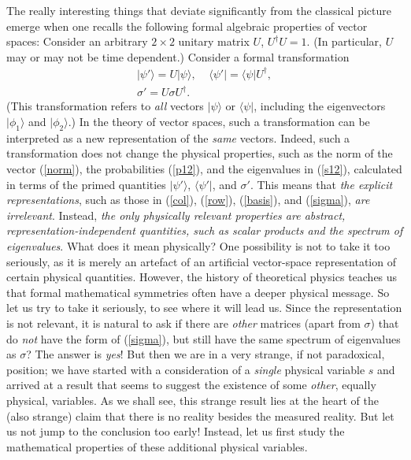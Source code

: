 \documentclass[12pt]{article}
\begin{document}
The really interesting things that deviate significantly from the  
classical picture emerge when one recalls the 
following formal algebraic properties of vector spaces:
Consider an arbitrary $2\times 2$ unitary matrix $U$, $U^{\dagger}U=1$.
(In particular, $U$ may or may not be time dependent.) 
Consider a formal transformation 
\begin{eqnarray}    
& |\psi'\rangle =U|\psi\rangle , \;\;\;\;
\langle\psi'|=\langle\psi|U^{\dagger} , & \nonumber \\ 
& \sigma'=U\sigma U^{\dagger} . &
\end{eqnarray}
(This transformation refers to {\em all} vectors $|\psi\rangle$
or $\langle\psi|$, 
including the eigenvectors $|\phi_1\rangle$ and $|\phi_2\rangle$.)  
In the theory of vector spaces, such a transformation can be interpreted 
as a new representation of the {\em same} vectors. 
Indeed, such a transformation does not change the physical properties, 
such as the norm of the vector (\ref{norm}), the probabilities
(\ref{p12}), and the eigenvalues in (\ref{s12}), calculated 
in terms of the primed quantities $|\psi'\rangle$, $\langle\psi'|$, 
and $\sigma'$. This means that {\em the explicit representations}, 
such as those in (\ref{col}), (\ref{row}), (\ref{basis}), and (\ref{sigma}),
{\em are irrelevant}. Instead, {\em the only physically relevant
properties are abstract, representation-independent quantities, 
such as scalar products and the spectrum of eigenvalues}.
What does it mean physically? One possibility is not to take it 
too seriously, as it is merely an artefact of an artificial 
vector-space representation of certain physical quantities.
However, the history of theoretical physics teaches us that formal 
mathematical symmetries often have a deeper physical message.
So let us try to take it seriously, to see where it 
will lead us. Since the representation is not relevant, 
it is natural to ask if there are {\em other} matrices
(apart from $\sigma$) that do {\em not} have the form 
of (\ref{sigma}), but still have the same spectrum of eigenvalues
as $\sigma$? The answer is {\em yes}! 
But then we are in a very strange, if not paradoxical, position; 
we have started with a consideration of a {\em single} physical variable 
$s$ and arrived at a result that seems to suggest the existence 
of some {\em other}, equally physical, variables. 
As we shall see, this strange result lies at the heart of the 
(also strange) claim
that there is no reality besides the measured reality.  
But let us not jump to the conclusion too early! Instead, let us 
first study the mathematical properties of these 
additional physical variables.
\end{document}
